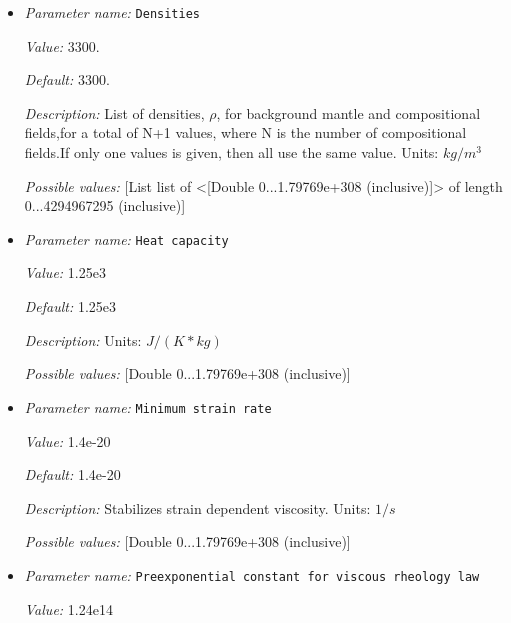 \begin{itemize}
{\it Default:} 117


{\it Description:} ($\tau_0$). Units: $Pa$


{\it Possible values:} [Double 0...1.79769e+308 (inclusive)]
\item {\it Parameter name:} {\tt Densities}
\label{parameters:Material model/Morency and Doin/Densities}


{\it Value:} 3300.


{\it Default:} 3300.


{\it Description:} List of densities, $\rho$, for background mantle and compositional fields,for a total of N+1 values, where N is the number of compositional fields.If only one values is given, then all use the same value.  Units: $kg / m^3$


{\it Possible values:} [List list of <[Double 0...1.79769e+308 (inclusive)]> of length 0...4294967295 (inclusive)]
\item {\it Parameter name:} {\tt Heat capacity}
\label{parameters:Material model/Morency and Doin/Heat capacity}


{\it Value:} 1.25e3


{\it Default:} 1.25e3


{\it Description:} Units: $J / (K * kg)$


{\it Possible values:} [Double 0...1.79769e+308 (inclusive)]
\item {\it Parameter name:} {\tt Minimum strain rate}
\label{parameters:Material model/Morency and Doin/Minimum strain rate}


{\it Value:} 1.4e-20


{\it Default:} 1.4e-20


{\it Description:} Stabilizes strain dependent viscosity. Units: $1 / s$


{\it Possible values:} [Double 0...1.79769e+308 (inclusive)]
\item {\it Parameter name:} {\tt Preexponential constant for viscous rheology law}
\label{parameters:Material model/Morency and Doin/Preexponential constant for viscous rheology law}


{\it Value:} 1.24e14



\end{itemize}
